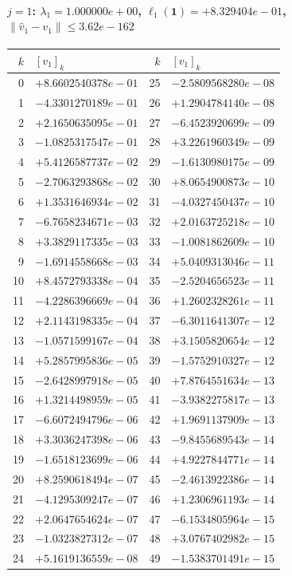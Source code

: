 \documentclass[11pt]{article}
\begin{document}
\paragraph{$j = 1$: $\lambda_{1} = 1.000000e+00$, \quad $\ell_{1}(\mathbf{1}) = +8.329404e-01$, \quad $\|\hat v_{1} - v_{1}\| \leq 3.62e-162$}
\begin{center}
{\footnotesize
\begin{tabular}{r@{\;\;}l@{\quad}r@{\;\;}l}
\toprule
$k$ & $[v_{1}]_k$ & $k$ & $[v_{1}]_k$ \\
\midrule
0 & $+8.6602540378e-01$ & 25 & $-2.5809568280e-08$ \\
1 & $-4.3301270189e-01$ & 26 & $+1.2904784140e-08$ \\
2 & $+2.1650635095e-01$ & 27 & $-6.4523920699e-09$ \\
3 & $-1.0825317547e-01$ & 28 & $+3.2261960349e-09$ \\
4 & $+5.4126587737e-02$ & 29 & $-1.6130980175e-09$ \\
5 & $-2.7063293868e-02$ & 30 & $+8.0654900873e-10$ \\
6 & $+1.3531646934e-02$ & 31 & $-4.0327450437e-10$ \\
7 & $-6.7658234671e-03$ & 32 & $+2.0163725218e-10$ \\
8 & $+3.3829117335e-03$ & 33 & $-1.0081862609e-10$ \\
9 & $-1.6914558668e-03$ & 34 & $+5.0409313046e-11$ \\
10 & $+8.4572793338e-04$ & 35 & $-2.5204656523e-11$ \\
11 & $-4.2286396669e-04$ & 36 & $+1.2602328261e-11$ \\
12 & $+2.1143198335e-04$ & 37 & $-6.3011641307e-12$ \\
13 & $-1.0571599167e-04$ & 38 & $+3.1505820654e-12$ \\
14 & $+5.2857995836e-05$ & 39 & $-1.5752910327e-12$ \\
15 & $-2.6428997918e-05$ & 40 & $+7.8764551634e-13$ \\
16 & $+1.3214498959e-05$ & 41 & $-3.9382275817e-13$ \\
17 & $-6.6072494796e-06$ & 42 & $+1.9691137909e-13$ \\
18 & $+3.3036247398e-06$ & 43 & $-9.8455689543e-14$ \\
19 & $-1.6518123699e-06$ & 44 & $+4.9227844771e-14$ \\
20 & $+8.2590618494e-07$ & 45 & $-2.4613922386e-14$ \\
21 & $-4.1295309247e-07$ & 46 & $+1.2306961193e-14$ \\
22 & $+2.0647654624e-07$ & 47 & $-6.1534805964e-15$ \\
23 & $-1.0323827312e-07$ & 48 & $+3.0767402982e-15$ \\
24 & $+5.1619136559e-08$ & 49 & $-1.5383701491e-15$ \\
\bottomrule
\end{tabular}
}
\end{center}
\end{document}
